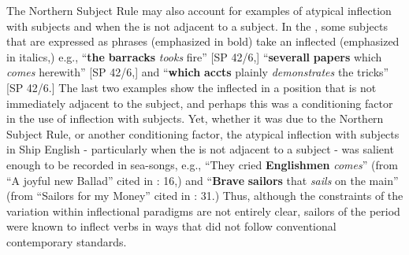 The Northern Subject Rule may also account for examples of atypical inflection with   subjects and when the  is not adjacent to a subject. In the , some   subjects that are expressed as  phrases (emphasized in bold) take an inflected  (emphasized in italics,) e.g., “\textbf{the} \textbf{barracks} \textit{tooks} fire” [SP 42/6,] “\textbf{severall} \textbf{papers} which \textit{comes} herewith” [SP 42/6,] and “\textbf{which} \textbf{accts} plainly \textit{demonstrates} the tricks” [SP 42/6.] The last two examples show the inflected  in a position that is not immediately adjacent to the  subject, and perhaps this was a conditioning factor in the use of inflection with  subjects. Yet, whether it was due to the Northern Subject Rule, or another conditioning factor, the atypical inflection with   subjects in Ship English - particularly when the  is not adjacent to a subject - was salient enough to be recorded in  sea-songs, e.g., “They cried \textbf{Englishmen} \textit{comes}” (from “A joyful new Ballad” cited in \citealt{Palmer1986}: 16,) and “\textbf{Brave} \textbf{sailors} that \textit{sails} on the main” (from “Sailors for my Money” cited in \citealt{Palmer1986}: 31.) Thus, although the constraints of the variation within inflectional paradigms are not entirely clear, sailors of the period were known to inflect verbs in ways that did not follow conventional contemporary standards. 

